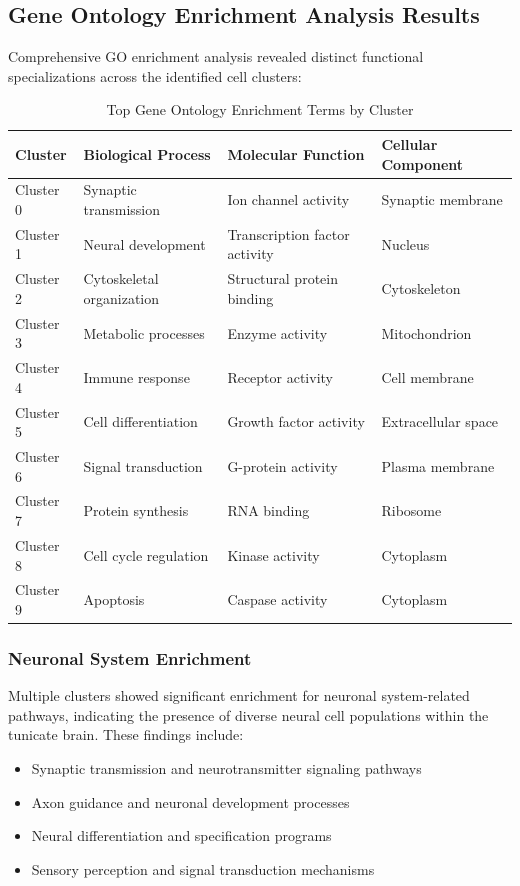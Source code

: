 \documentclass[12pt,a4paper]{article}
\begin{document}
\subsection{Gene Ontology Enrichment Analysis Results}

Comprehensive GO enrichment analysis revealed distinct functional specializations across the identified cell clusters:

\begin{table}[H]
\centering
\caption{Top Gene Ontology Enrichment Terms by Cluster}
\begin{tabular}{llll}
\toprule
\textbf{Cluster} & \textbf{Biological Process} & \textbf{Molecular Function} & \textbf{Cellular Component} \\
\midrule
Cluster 0 & Synaptic transmission & Ion channel activity & Synaptic membrane \\
Cluster 1 & Neural development & Transcription factor activity & Nucleus \\
Cluster 2 & Cytoskeletal organization & Structural protein binding & Cytoskeleton \\
Cluster 3 & Metabolic processes & Enzyme activity & Mitochondrion \\
Cluster 4 & Immune response & Receptor activity & Cell membrane \\
Cluster 5 & Cell differentiation & Growth factor activity & Extracellular space \\
Cluster 6 & Signal transduction & G-protein activity & Plasma membrane \\
Cluster 7 & Protein synthesis & RNA binding & Ribosome \\
Cluster 8 & Cell cycle regulation & Kinase activity & Cytoplasm \\
Cluster 9 & Apoptosis & Caspase activity & Cytoplasm \\
\bottomrule
\end{tabular}
\end{table}

\subsubsection{Neuronal System Enrichment}
Multiple clusters showed significant enrichment for neuronal system-related pathways, indicating the presence of diverse neural cell populations within the tunicate brain. These findings include:

\begin{itemize}
\item Synaptic transmission and neurotransmitter signaling pathways
\item Axon guidance and neuronal development processes
\item Neural differentiation and specification programs
\item Sensory perception and signal transduction mechanisms
\end{itemize}
\end{document}
